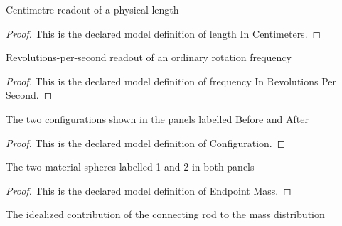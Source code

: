 \begin{definition}
  \label{def:physics:phyx-mini-0711:phyxminiproblems-problemphyxmini0711-lengthincentimeters}
  Centimetre readout of a physical length
\end{definition}
\begin{proof}
  This is the declared model definition of length In Centimeters.
\end{proof}
\begin{definition}
  \label{def:physics:phyx-mini-0711:phyxminiproblems-problemphyxmini0711-frequencyinrevolutionspersecond}
  Revolutions-per-second readout of an ordinary rotation frequency
\end{definition}
\begin{proof}
  This is the declared model definition of frequency In Revolutions Per Second.
\end{proof}
\begin{definition}[Configuration]
  \label{def:physics:phyx-mini-0711:phyxminiproblems-problemphyxmini0711-configuration}
  The two configurations shown in the panels labelled Before and After
\end{definition}
\begin{proof}
  This is the declared model definition of Configuration.
\end{proof}
\begin{definition}
  \label{def:physics:phyx-mini-0711:phyxminiproblems-problemphyxmini0711-endpointmass}
  The two material spheres labelled 1 and 2 in both panels
\end{definition}
\begin{proof}
  This is the declared model definition of Endpoint Mass.
\end{proof}
\begin{definition}
  \label{def:physics:phyx-mini-0711:phyxminiproblems-problemphyxmini0711-rodmassmodel}
  The idealized contribution of the connecting rod to the mass distribution
\end{definition}
